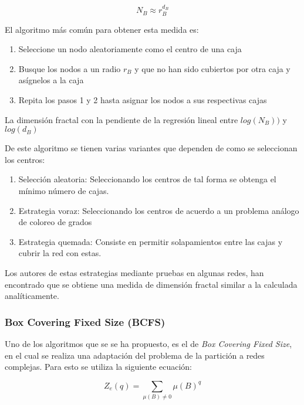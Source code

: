 \begin{equation}
    N_B \approx r_B^{d_B}
\end{equation}

El algoritmo más común para obtener esta medida es:

\begin{enumerate}
    \item Seleccione un nodo aleatoriamente como el centro de una caja
    \item Busque los nodos a un radio $r_B$ y que no han sido cubiertos por otra caja y asígnelos a la caja
    \item Repita los pasos 1 y 2 hasta asignar los nodos a sus respectivas cajas
\end{enumerate}

La dimensión fractal con la pendiente de la regresión lineal entre $log(N_B))$ y $log(d_B)$

De este algoritmo se tienen varias variantes que dependen de como se seleccionan los centros:

\begin{enumerate}
    \item Selección aleatoria\cite{Kim2007B}: Seleccionando los centros de tal forma se obtenga el mínimo número de cajas.
    \item Estrategia voraz\cite{Song2007}: Seleccionando los centros de acuerdo a un problema análogo de coloreo de grados
    \item Estrategia quemada\cite{Song2007}: Consiste en permitir solapamientos entre las cajas  y cubrir la red con estas.
\end{enumerate}

Los autores de estas estrategias mediante pruebas en algunas redes, han encontrado que se obtiene una medida de dimensión fractal similar a la calculada analíticamente.



\subsubsection{Box Covering Fixed Size (BCFS)}

Uno de los algoritmos que se se ha propuesto, es el de \textit{Box Covering Fixed Size}\cite{Halsey1986}\cite{RendondelaTorre2017}\cite{Yu2003}, en el cual se realiza una adaptación del problema de la partición\cite{9780195177374} a redes complejas. Para esto se utiliza la siguiente ecuación:

\begin{equation}
    Z_e(q) =  \sum \limits_{\mu(B) \neq 0} \mu(B)^q
\end{equation}

